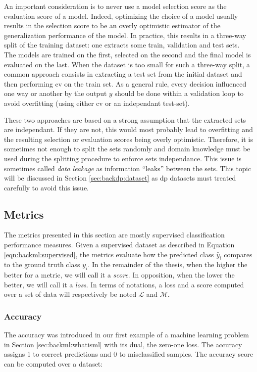 An important consideration is to never use a model selection score as the evaluation score of a model. Indeed, optimizing the choice of a model usually results in the selection score to be an overly optimistic estimator of the generalization performance of the model. In practice, this results in a three-way split of the training dataset: one extracts some train, validation and test sets. The models are trained on the first, selected on the second and the final model is evaluated on the last. When the dataset is too small for such a three-way split, a common approach consists in extracting a test set from the initial dataset and then performing \acrlong{cv} on the train set. As a general rule, every decision influenced one way or another by the output $y$ should be done within a validation loop to avoid overfitting (using either \acrlong{cv} or an independant test-set).

These two approaches are based on a strong assumption that the extracted sets are independant. If they are not, this would most probably lead to overfitting and the resulting selection or evaluation scores being overly optimistic. Therefore, it is sometimes not enough to split the sets randomly and domain knowledge must be used during the splitting procedure to enforce sets independance. This issue is sometimes called \textit{data leakage} \parencite{kaufman2012leakage} as information ``leaks'' between the sets. This topic will be discussed in Section \ref{sec:backdp:dataset} as \acrlong{dp} datasets must treated carefully to avoid this issue. 

\subsection{Metrics}
\label{ssec:backml:metrics}

The metrics presented in this section are mostly supervised classification performance measures. Given a supervised dataset as described in Equation \ref{eqn:backml:supervised}, the metrics evaluate how the predicted class $\hat{y}_i$ compares to the ground truth class $y_i$. In the remainder of the thesis, when the higher the better for a metric, we will call it a \textit{score}. In opposition, when the lower the better, we will call it a \textit{loss}. In terms of notations, a loss and a score computed over a set of data will respectively be noted $\mathcal{L}$ and $\mathcal{M}$.

\subsubsection{Accuracy}
\label{sssec:backml:metric:acc}
The accuracy was introduced in our first example of a machine learning problem in Section \ref{sec:backml:whatisml} with its dual, the zero-one loss. The accuracy assigns 1 to correct predictions and 0 to misclassified samples. The accuracy score can be computed over a dataset:

